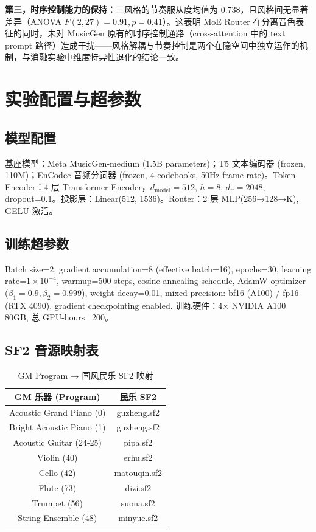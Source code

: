 \documentclass[11pt,twocolumn]{article}
\begin{document}
\textbf{第三，时序控制能力的保持：}三风格的节奏服从度均值为 0.738，且风格间无显著差异（ANOVA $F(2,27)=0.91, p=0.41$）。这表明 MoE Router 在分离音色表征的同时，未对 MusicGen 原有的时序控制通路（cross-attention 中的 text prompt 路径）造成干扰——风格解耦与节奏控制是两个在隐空间中独立运作的机制，与消融实验中维度特异性退化的结论一致。


\newpage
\appendix
\section{实验配置与超参数}

\subsection{模型配置}
基座模型：Meta MusicGen-medium (1.5B parameters)；T5 文本编码器 (frozen, 110M)；EnCodec 音频分词器 (frozen, 4 codebooks, 50Hz frame rate)。Token Encoder：4 层 Transformer Encoder，$d_{\text{model}}=512$, $h=8$, $d_{\text{ff}}=2048$, dropout=0.1。投影层：Linear(512, 1536)。Router：2 层 MLP(256→128→K), GELU 激活。

\subsection{训练超参数}
Batch size=2, gradient accumulation=8 (effective batch=16), epochs=30, learning rate=$1\times10^{-4}$, warmup=500 steps, cosine annealing schedule, AdamW optimizer ($\beta_1=0.9,\beta_2=0.999$), weight decay=0.01, mixed precision: bf16 (A100) / fp16 (RTX 4090), gradient checkpointing enabled. 训练硬件：4× NVIDIA A100 80GB, 总 GPU-hours ~200。

\subsection{SF2 音源映射表}
\begin{table}[H]
\centering\footnotesize
\caption{GM Program → 国风民乐 SF2 映射}
\begin{tabular}{c|c}
\toprule
GM 乐器 (Program) & 民乐 SF2 \\
\midrule
Acoustic Grand Piano (0) & guzheng.sf2 \\
Bright Acoustic Piano (1) & guzheng.sf2 \\
Acoustic Guitar (24-25) & pipa.sf2 \\
Violin (40) & erhu.sf2 \\
Cello (42) & matouqin.sf2 \\
Flute (73) & dizi.sf2 \\
Trumpet (56) & suona.sf2 \\
String Ensemble (48) & minyue.sf2 \\
\bottomrule
\end{tabular}
\end{table}
\end{document}
